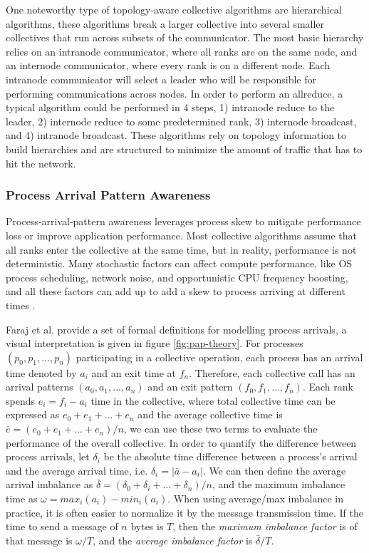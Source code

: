 One noteworthy type of topology-aware collective algorithms are hierarchical algorithms, these algorithms break a larger collective into several smaller collectives that run across subsets of the communicator. 
The most basic hierarchy relies on an intranode communicator, where all ranks are on the same node, and an internode communicator, where every rank is on a different node.
Each intranode communicator will select a leader who will be responsible for performing communications across nodes.
In order to perform an allreduce, a typical algorithm could be performed in 4 steps, 1) intranode reduce to the leader, 2) internode reduce to some predetermined rank, 3) internode broadcast, and 4) intranode broadcast.
These algorithms rely on topology information to build hierarchies and are structured to minimize the amount of traffic that has to hit the network. 

\subsubsection{Process Arrival Pattern Awareness}
Process-arrival-pattern awareness leverages process skew to mitigate performance loss or improve application performance. 
Most collective algorithms assume that all ranks enter the collective at the same time, but in reality, performance is not deterministic.
Many stochastic factors can affect compute performance, like OS process scheduling, network noise, and opportunistic CPU frequency boosting, and all these factors can add up to add a skew to process arriving at different times \cite{Faraj2008StudyProcArrivalMPIColl}.



Faraj et al. \cite{Faraj2008StudyProcArrivalMPIColl} provide a set of formal definitions for modelling process arrivals, a visual interpretation is given in figure \ref{fig:pap-theory}.
For processes $(p_0, p_1,...,p_n)$ participating in a collective operation, each process has an arrival time denoted by $a_i$ and an exit time at $f_n$.
Therefore, each collective call has an arrival patterns $(a_0, a_1, ..., a_n)$ and an exit pattern $(f_0, f_1, ..., f_n)$.
Each rank spends $e_i = f_i - a_i$ time in the collective, where total collective time can be expressed as $e_0 + e_1 + ... + e_n$ and the average collective time is $\bar{e} = (e_0 + e_1 + ... + e_n)/n$, we can use these two terms to evaluate the performance of the overall collective.
In order to quantify the difference between process arrivals, let $\delta_i$ be the absolute time difference between a process's arrival and the average arrival time, i.e. $\delta_i = |\bar{a} - a_i|$. 
We can then define the average arrival imbalance as $\bar{\delta}=(\delta_0 + \delta_i + ... + \delta_n)/n$, and the maximum imbalance time as $\omega = max_i(a_i)-min_i(a_i)$.
When using average/max imbalance in practice, it is often easier to normalize it by the message transmission time.
If the time to send a message of $n$ bytes is $T$, then the \textit{maximum imbalance factor} is of that message is $\omega/T$, and the \textit{average imbalance factor} is $\bar{\delta}/T$.

